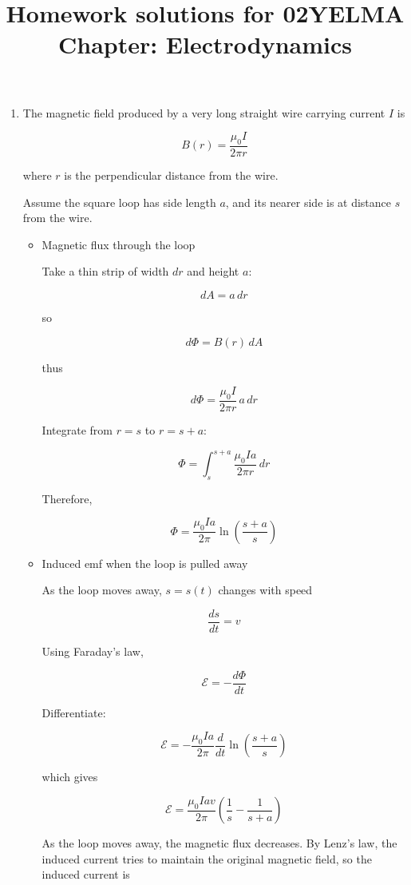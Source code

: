 \documentclass[12pt]{article}
\title{Homework solutions for 02YELMA \\ Chapter: Electrodynamics}
\begin{document}
\date{}
\maketitle
\vspace{-0.8in}

\begin{enumerate}

\item The magnetic field produced by a very long straight wire carrying current \(I\) is

\[
B(r)=\frac{\mu_0 I}{2\pi r}
\]

where \(r\) is the perpendicular distance from the wire.

Assume the square loop has side length \(a\), and its nearer side is at distance \(s\) from the wire.

\begin{itemize}
\item[(a)] Magnetic flux through the loop

Take a thin strip of width \(dr\) and height \(a\):

\[
dA=a\,dr
\]

so

\[
d\Phi = B(r)\,dA
\]

thus

\[
d\Phi
=
\frac{\mu_0 I}{2\pi r}\,a\,dr
\]

Integrate from \(r=s\) to \(r=s+a\):

\[
\Phi
=
\int_s^{s+a}
\frac{\mu_0 I a}{2\pi r}\,dr
\]

Therefore,

\[
\boxed{
\Phi
=
\frac{\mu_0 I a}{2\pi}
\ln\!\left(\frac{s+a}{s}\right)
}
\]

\item[(b)] Induced emf when the loop is pulled away

As the loop moves away, \(s=s(t)\) changes with speed

\[
\frac{ds}{dt}=v
\]

Using Faraday’s law,

\[
\mathcal{E}
=
-\frac{d\Phi}{dt}
\]

Differentiate:

\[
\mathcal{E}
=
-
\frac{\mu_0 I a}{2\pi}
\frac{d}{dt}
\ln\!\left(\frac{s+a}{s}\right)
\]

which gives

\[
\boxed{
\mathcal{E}
=
\frac{\mu_0 I a v}{2\pi}
\left(
\frac{1}{s}
-
\frac{1}{s+a}
\right)
}
\]

As the loop moves away, the magnetic flux decreases. By Lenz’s law, the induced current tries to maintain the original magnetic field, so the induced current is


\end{itemize}
\end{enumerate}
\end{document}
